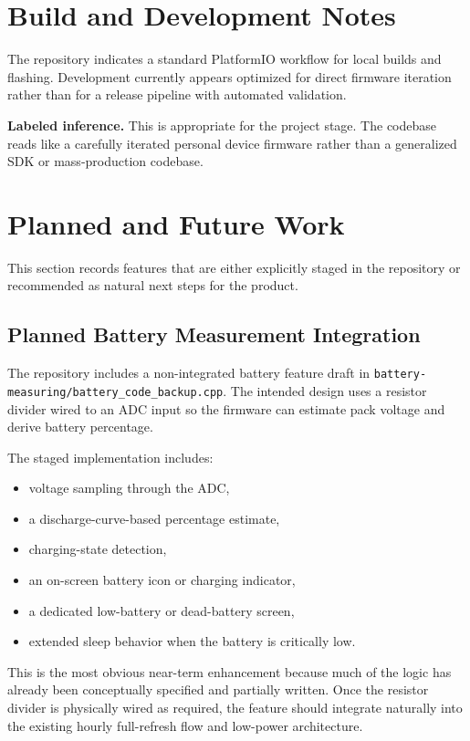 \documentclass[11pt]{article}
\begin{document}
\section{Build and Development Notes}
The repository indicates a standard PlatformIO workflow for local builds and flashing. Development currently appears optimized for direct firmware iteration rather than for a release pipeline with automated validation.

\textbf{Labeled inference.} This is appropriate for the project stage. The codebase reads like a carefully iterated personal device firmware rather than a generalized SDK or mass-production codebase.

\section{Planned and Future Work}
This section records features that are either explicitly staged in the repository or recommended as natural next steps for the product.

\subsection{Planned Battery Measurement Integration}
The repository includes a non-integrated battery feature draft in \texttt{battery-measuring/battery\_code\_backup.cpp}. The intended design uses a resistor divider wired to an ADC input so the firmware can estimate pack voltage and derive battery percentage.

The staged implementation includes:
\begin{itemize}
  \item voltage sampling through the ADC,
  \item a discharge-curve-based percentage estimate,
  \item charging-state detection,
  \item an on-screen battery icon or charging indicator,
  \item a dedicated low-battery or dead-battery screen,
  \item extended sleep behavior when the battery is critically low.
\end{itemize}

This is the most obvious near-term enhancement because much of the logic has already been conceptually specified and partially written. Once the resistor divider is physically wired as required, the feature should integrate naturally into the existing hourly full-refresh flow and low-power architecture.
\end{document}
